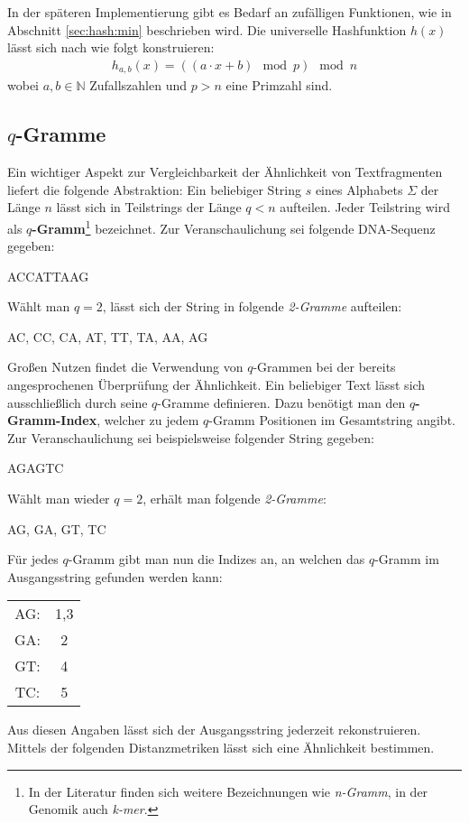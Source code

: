 In der späteren Implementierung gibt es Bedarf an zufälligen Funktionen, wie in Abschnitt \ref{sec:hash:min} beschrieben wird.
Die universelle Hashfunktion $h(x)$ lässt sich nach \citet{Leskovec2014a} wie folgt konstruieren:
\begin{align*}
	h_{a,b}(x) = ((a \cdot x + b) \mod p) \mod n
\end{align*}
wobei $a, b \in \mathbb{N}$ Zufallszahlen und $p > n$ eine Primzahl sind.
\subsection{\texorpdfstring{$q$}{q}-Gramme}
\label{sec:hash:qgram}
Ein wichtiger Aspekt zur Vergleichbarkeit der Ähnlichkeit von Textfragmenten liefert die folgende Abstraktion: Ein beliebiger String $s$ eines Alphabets $\Sigma$ der Länge $n$ lässt sich in Teilstrings der Länge $q < n$ aufteilen.
Jeder Teilstring wird als \textbf{$q$-Gramm}\footnote{In der Literatur finden sich weitere Bezeichnungen wie \textit{n-Gramm}, in der Genomik auch \textit{k-mer}.} bezeichnet.
Zur Veranschaulichung sei folgende DNA-Sequenz gegeben:
\begin{center}
	ACCATTAAG
\end{center}
Wählt man $q = 2$, lässt sich der String in folgende \textit{2-Gramme} aufteilen:
\begin{center}
	AC, CC, CA, AT, TT, TA, AA, AG
\end{center}
Großen Nutzen findet die Verwendung von $q$-Grammen bei der bereits angesprochenen Überprüfung der Ähnlichkeit.
Ein beliebiger Text lässt sich ausschließlich durch seine $q$-Gramme definieren.
Dazu benötigt man den \textbf{$q$-Gramm-Index}, welcher zu jedem $q$-Gramm Positionen im Gesamtstring angibt.
Zur Veranschaulichung sei beispielsweise folgender String gegeben:
\begin{center}
	AGAGTC
\end{center}
Wählt man wieder $q = 2$, erhält man folgende \textit{2-Gramme}:
\begin{center}
	AG, GA, GT, TC
\end{center}
Für jedes $q$-Gramm gibt man nun die Indizes an, an welchen das $q$-Gramm im Ausgangsstring gefunden werden kann:
\begin{center}
\begin{tabular}{cc}
AG: & 1,3 \\ 
GA: & 2 \\ 
GT: & 4 \\ 
TC: & 5 \\ 
\end{tabular} 
\end{center}
Aus diesen Angaben lässt sich der Ausgangsstring jederzeit rekonstruieren.
Mittels der folgenden Distanzmetriken lässt sich eine Ähnlichkeit bestimmen.
